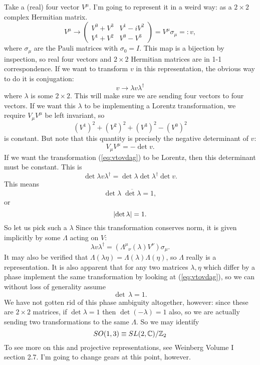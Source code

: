 \documentclass[main.tex]{subfiles}
\begin{document}
Take a (real) four vector $V^\mu$. I'm going to represent it in a weird way: as a $2 \times 2$ complex Hermitian matrix.
\begin{equation}
V^\mu \to \begin{pmatrix}
V^0 + V^3 & V^1 - iV^2 \\
V^1 + V^2 & V^0 - V^3
\end{pmatrix} = V^\mu \sigma_\mu =: v,
\end{equation}
where $\sigma_\mu$ are the Pauli matrices with $\sigma_0 = I$. This map is a bijection by inspection, so real four vectors and $2\times 2$ Hermitian matrices are in 1-1 correspondence. If we want to transform $v$ in this representation, the obvious way to do it is conjugation:
\begin{equation} \label{eq:vtovdag}
v \to \lambda v \lambda^\dagger
\end{equation}
where $\lambda$ is some $2\times 2$. This will make sure we are sending four vectors to four vectors. If we want this $\lambda$ to be implementing a Lorentz transformation, we require $V_\mu V^\mu$ be left invariant, so 
\[
(V^1)^2 + (V^2)^2 + (V^3)^2 - (V^0)^2 
\]
is constant. But note that this quantity is precisely the negative determinant of $v$:
\[
V_\mu V^\mu = - \det v.
\]
If we want the transformation (\ref{eq:vtovdag}) to be Lorentz, then this determinant must be constant. This is
\[
\det{\lambda v \lambda^{\dagger}} = \det {\lambda} \det{\lambda^\dagger} \det v.
\]
This means
\[
\det \lambda \; \overline{\det \lambda} = 1,
\]
or
\[
\abs{\det \lambda} = 1.
\]
So let us pick such a $\lambda$ Since this transformation conserves norm, it is given implicitly by some $\Lambda$ acting on $V$:
\[
\lambda v \lambda^\dagger = ({\Lambda^\mu}_\nu (\lambda) V^\nu)\sigma_\mu.
\]
It may also be verified that $\Lambda(\lambda \eta) = \Lambda(\lambda) \Lambda(\eta)$, so $\Lambda$ really is a representation. It is also apparent that for any two matrices $\lambda,\eta$ which differ by a phase implement the same transformation by looking at (\ref{eq:vtovdag}), so we can without loss of generality assume
\[
\det \, \lambda = 1.
\]
We have not gotten rid of this phase ambiguity altogether, however: since these are $2\times 2$ matrices, if $\det \lambda = 1$ then $\det (-\lambda) = 1$ also, so we are actually sending two transformations to the same $\Lambda$. So we may identify 
\[
SO(1,3) \equiv SL(2,\mathbb{C})/\mathbb{Z}_2
\]
To see more on this and projective representations, see Weinberg Volume I section 2.7. I'm going to change gears at this point, however.
\end{document}
